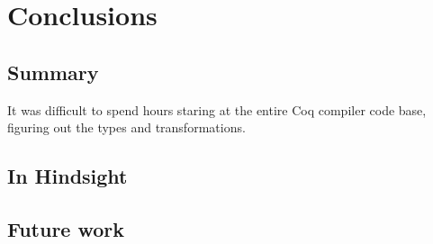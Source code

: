 \chapter{Conclusions}

%

\section{Summary}

It was difficult to spend hours staring at the entire Coq compiler code base,
figuring out the types and transformations.

\section{In Hindsight}

\section{Future work}
